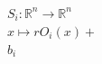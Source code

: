 \documentclass[preview]{standalone}
\begin{document}
\begin{align*}
S_i : \mathbb{R}^n \to \mathbb{R}^n \\  x \mapsto r O_i(x) + \\ b_i
\end{align*}
\end{document}

